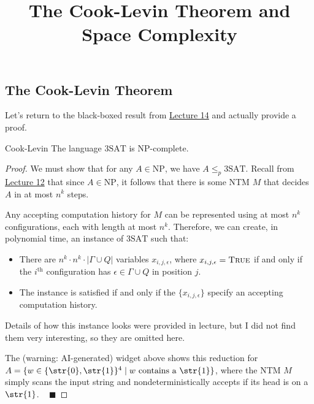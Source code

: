 \title{The Cook-Levin Theorem and Space Complexity}



\subsection{The Cook-Levin Theorem}

Let's return to the black-boxed result from
\href{/18.404/lectures/14/#np-completeness}{Lecture 14}
and actually provide a proof.

\begin{theorem}{Cook-Levin}
    The language $\mathrm{3SAT}$ is NP-complete.
\end{theorem}

\begin{proof}
    We must show that for any $A \in \mathrm{NP}$, we have
    $A \leq_p \mathrm{3SAT}$.
    Recall from \href{/18.404/lectures/12-13/#polynomial-verifiability-np}{Lecture 12}
    that since $A \in \mathrm{NP}$,
    it follows that there is some NTM $M$
    that decides $A$ in at most $n^k$ steps.

    Any accepting computation history for $M$
    can be represented using at most $n^k$ configurations,
    each with length at most $n^k$.
    Therefore, we can create, in polynomial time, an instance of $\mathrm{3SAT}$ such that:
    \begin{itemize}
        \item There are $n^k \cdot n^k \cdot |\Gamma \cup Q|$ variables
        $x_{i, j, \epsilon}$, where $x_{i, j, \epsilon} = \textsc{True}$
        if and only if the $i^{\text{th}}$ configuration has
        $\epsilon \in \Gamma \cup Q$ in position $j$.
        \item The instance is satisfied
        if and only if the $\{x_{i, j, \epsilon}\}$ specify
        an accepting computation history.
    \end{itemize}
    Details of how this instance looks were provided in lecture,
    but I did not find them very interesting,
    so they are omitted here.


    The (warning: AI-generated) widget above
    shows this reduction for 
    $A = \{w \in \{\str{0}, \str{1}\}^4
    \mid w \text{ contains a } \str{1}\}$,
    where the NTM $M$ simply scans the input string
    and nondeterministically accepts if
    its head is on a $\str{1}$.
    ~ $\blacksquare$
\end{proof}

